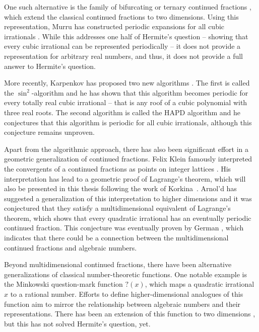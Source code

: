 One such alternative is the family of bifurcating or ternary continued
fractions \cite{Gupta00},
which extend the classical continued fractions to two dimensions.
Using this representation, Murru has constructed periodic expansions for all
cubic irrationals \cite{Murru15}.
While this addresses one half of Hermite’s question --
showing that every cubic irrational can be represented periodically --
it does not provide a representation for arbitrary real numbers,
and thus, it does not provide a full answer to Hermite's question.

More recently, Karpenkov has proposed two new algorithms \cite{Karpenkov21, Karpenkov24}.
The first is called the $\sin^2$-algorithm and he has shown that this algorithm
becomes periodic for every totally real cubic irrational -- that is any roof of
a cubic polynomial with three real roots.
The second algorithm is called the HAPD algorithm \cite{Karpenkov24} and he
conjectures that this algorithm is periodic for all cubic irrationals,
although this conjecture remains unproven.

Apart from the algorithmic approach,
there has also been significant effort in a geometric generalization of
continued fractions.
Felix Klein famously interpreted the convergents of a continued fractions as
points on integer lattices \cite{Klein95}.
His interpretation has lead to a geometric proof of Lagrange’s theorem, which
will also be presented in this thesis following the work of Korkina~\cite{Korkina96}.
Arnol'd has suggested a generalization of this interpretation to higher
dimensions \cite{Arnold98} and it was conjectured that they satisfy a
multidimensional equivalent of Lagrange's theorem,
which shows that every quadratic irrational has an eventually periodic
continued fraction.
This conjecture was eventually proven by German \cite{German08},
which indicates that there could be a connection between the multidimensional
continued fractions and algebraic numbers.

Beyond multidimensional continued fractions, there have been alternative
generalizations of classical number-theoretic functions.
One notable example is the Minkowski question-mark function $?(x)$,
which maps a quadratic irrational $x$ to a rational number.
Efforts to define higher-dimensional analogues of this function aim to mirror
the relationship between algebraic numbers and their representations.
There has been an extension of this function to two dimensions \cite{Beaver04},
but this has not solved Hermite's question, yet.


